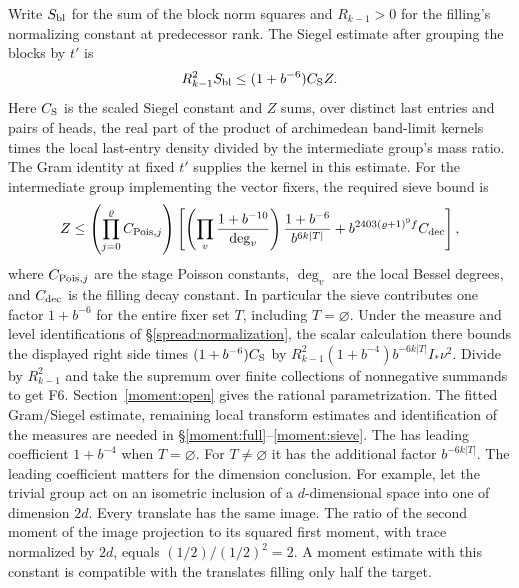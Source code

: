 Write \(S_{\rm bl}\) for the sum of the block norm squares and
\(R_{k-1}>0\) for the filling's normalizing constant at predecessor
rank. The Siegel estimate after grouping the blocks by \(t'\) is
\[
 R_{k-1}^2 S_{\rm bl}\le(1+b^{-6})C_{\rm S} Z.
\]
Here \(C_{\rm S}\) is the scaled Siegel constant and \(Z\) sums,
over distinct last entries and pairs of heads, the real part of the
product of archimedean band-limit kernels times the local
last-entry density divided by the intermediate group's mass ratio.
The Gram identity at fixed \(t'\) supplies the kernel in this estimate.
For the intermediate group implementing the vector fixers, the
required sieve bound is
\[
 Z\le\left(\prod_{j=0}^{\varrho}C_{{\rm Pois},j}\right)
 \left[
  \left(\prod_{v}\frac{1+b^{-10}}{\deg_v}\right)
  \frac{1+b^{-6}}{b^{6k|T|}}+
  b^{2403(\varrho+1)^9 f}C_{\rm dec}
 \right],
\]
where \(C_{{\rm Pois},j}\) are the stage Poisson constants,
\(\deg_v\) are the local Bessel degrees, and \(C_{\rm dec}\) is
the filling decay constant. In particular the sieve contributes one
factor \(1+b^{-6}\) for the entire fixer set \(T\), including \(T=\varnothing\).
Under the measure and level identifications of \S\ref{spread:normalization}, the scalar calculation there bounds the displayed right side times
\((1+b^{-6})C_{\rm S}\) by
\(R_{k-1}^2(1+b^{-4})b^{-6k|T|}I_*\nu^2\).
Divide by \(R_{k-1}^2\) and take the supremum over finite collections
of nonnegative summands to get F6. Section~\ref{moment:open} gives the rational parametrization.
The fitted Gram/Siegel estimate, remaining local transform estimates and
identification of the measures are needed in \S\ref{moment:full}--\ref{moment:sieve}. The
has leading coefficient \(1+b^{-4}\) when \(T=\varnothing\).
For \(T\ne\varnothing\) it has the additional factor \(b^{-6k|T|}\).
The leading coefficient matters for the dimension conclusion. For example,
let the trivial group act on an isometric inclusion of a \(d\)-dimensional
space into one of dimension \(2d\). Every translate has the same image.
The ratio of the second moment of the image projection to its
squared first moment, with trace normalized by \(2d\), equals
\((1/2)/(1/2)^2=2\). A moment estimate with this constant is compatible
with the translates filling only half the target.

